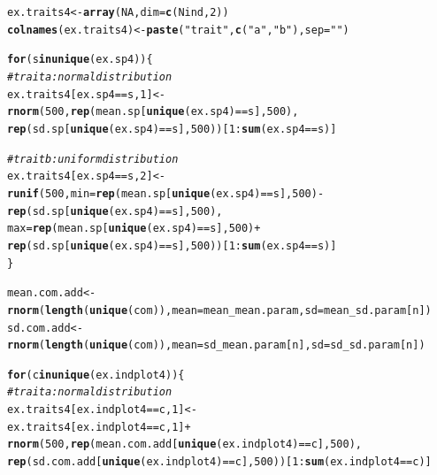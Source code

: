 \documentclass[12pt]{article}\usepackage[]{graphicx}\usepackage[]{color}
\makeatletter
\newcommand{\hlnum}[1]{\textcolor[rgb]{0.686,0.059,0.569}{#1}}%
\newcommand{\hlstr}[1]{\textcolor[rgb]{0.192,0.494,0.8}{#1}}%
\newcommand{\hlcom}[1]{\textcolor[rgb]{0.678,0.584,0.686}{\textit{#1}}}%
\newcommand{\hlopt}[1]{\textcolor[rgb]{0,0,0}{#1}}%
\newcommand{\hlstd}[1]{\textcolor[rgb]{0.345,0.345,0.345}{#1}}%
\newcommand{\hlkwa}[1]{\textcolor[rgb]{0.161,0.373,0.58}{\textbf{#1}}}%
\newcommand{\hlkwb}[1]{\textcolor[rgb]{0.69,0.353,0.396}{#1}}%
\newcommand{\hlkwc}[1]{\textcolor[rgb]{0.333,0.667,0.333}{#1}}%
\newcommand{\hlkwd}[1]{\textcolor[rgb]{0.737,0.353,0.396}{\textbf{#1}}}%
\newenvironment{kframe}{%
 \def\at@end@of@kframe{}%
 \ifinner\ifhmode%
  \def\at@end@of@kframe{\end{minipage}}%
  \begin{minipage}{\columnwidth}%
 \fi\fi%
 \def\FrameCommand##1{\hskip\@totalleftmargin \hskip-\fboxsep
 \colorbox{shadecolor}{##1}\hskip-\fboxsep
     \hskip-\linewidth \hskip-\@totalleftmargin \hskip\columnwidth}%
 \MakeFramed {\advance\hsize-\width
   \@totalleftmargin\z@ \linewidth\hsize
   \@setminipage}}%
 {\par\unskip\endMakeFramed%
 \at@end@of@kframe}
\newenvironment{knitrout}{}{} %
\makeatother
\begin{document}
\begin{knitrout}
\begin{kframe}
\begin{alltt}
\hlstd{ex.traits4} \hlkwb{<-} \hlkwd{array}\hlstd{(}\hlnum{NA}\hlstd{,} \hlkwc{dim} \hlstd{=} \hlkwd{c}\hlstd{(Nind,} \hlnum{2}\hlstd{))}
\hlkwd{colnames}\hlstd{(ex.traits4)} \hlkwb{<-} \hlkwd{paste}\hlstd{(}\hlstr{"trait"}\hlstd{,} \hlkwd{c}\hlstd{(}\hlstr{"a"}\hlstd{,} \hlstr{"b"}\hlstd{),} \hlkwc{sep} \hlstd{=} \hlstr{" "}\hlstd{)}

\hlkwa{for}\hlstd{(s} \hlkwa{in} \hlkwd{unique}\hlstd{(ex.sp4))\{}
 \hlcom{#trait a : normal distribution}
 \hlstd{ex.traits4[ex.sp4} \hlopt{==} \hlstd{s,} \hlnum{1}\hlstd{]} \hlkwb{<-} \hlkwd{rnorm}\hlstd{(}\hlnum{500}\hlstd{,} \hlkwd{rep}\hlstd{(mean.sp[}\hlkwd{unique}\hlstd{(ex.sp4)} \hlopt{==} \hlstd{s],} \hlnum{500}\hlstd{),}
         \hlkwd{rep}\hlstd{(sd.sp[}\hlkwd{unique}\hlstd{(ex.sp4)} \hlopt{==} \hlstd{s],} \hlnum{500}\hlstd{))[}\hlnum{1}\hlopt{:}\hlkwd{sum}\hlstd{(ex.sp4} \hlopt{==} \hlstd{s)]}

 \hlcom{#trait b : uniform distribution}
 \hlstd{ex.traits4[ex.sp4} \hlopt{==} \hlstd{s,} \hlnum{2}\hlstd{]} \hlkwb{<-} \hlkwd{runif}\hlstd{(}\hlnum{500}\hlstd{,} \hlkwc{min} \hlstd{=} \hlkwd{rep}\hlstd{(mean.sp[}\hlkwd{unique}\hlstd{(ex.sp4)} \hlopt{==} \hlstd{s],} \hlnum{500}\hlstd{)} \hlopt{-}
         \hlkwd{rep}\hlstd{(sd.sp[}\hlkwd{unique}\hlstd{(ex.sp4)} \hlopt{==} \hlstd{s],} \hlnum{500}\hlstd{),}
         \hlkwc{max} \hlstd{=} \hlkwd{rep}\hlstd{(mean.sp[}\hlkwd{unique}\hlstd{(ex.sp4)} \hlopt{==} \hlstd{s],} \hlnum{500}\hlstd{)} \hlopt{+}
         \hlkwd{rep}\hlstd{(sd.sp[}\hlkwd{unique}\hlstd{(ex.sp4)} \hlopt{==} \hlstd{s],} \hlnum{500}\hlstd{))[}\hlnum{1}\hlopt{:}\hlkwd{sum}\hlstd{(ex.sp4} \hlopt{==} \hlstd{s)]}
\hlstd{\}}

\hlstd{mean.com.add} \hlkwb{<-} \hlkwd{rnorm}\hlstd{(}\hlkwd{length}\hlstd{(}\hlkwd{unique}\hlstd{(com)),} \hlkwc{mean} \hlstd{= mean_mean.param,} \hlkwc{sd} \hlstd{= mean_sd.param[n])}
\hlstd{sd.com.add} \hlkwb{<-} \hlkwd{rnorm}\hlstd{(}\hlkwd{length}\hlstd{(}\hlkwd{unique}\hlstd{(com)),} \hlkwc{mean} \hlstd{= sd_mean.param[n],} \hlkwc{sd} \hlstd{= sd_sd.param[n])}

\hlkwa{for}\hlstd{(c} \hlkwa{in} \hlkwd{unique}\hlstd{(ex.indplot4))\{}
 \hlcom{#trait a : normal distribution}
 \hlstd{ex.traits4[ex.indplot4} \hlopt{==} \hlstd{c,} \hlnum{1}\hlstd{]} \hlkwb{<-}
 \hlstd{ex.traits4[ex.indplot4} \hlopt{==} \hlstd{c,} \hlnum{1}\hlstd{]} \hlopt{+}
 \hlkwd{rnorm}\hlstd{(}\hlnum{500}\hlstd{,} \hlkwd{rep}\hlstd{(mean.com.add[}\hlkwd{unique}\hlstd{(ex.indplot4)} \hlopt{==} \hlstd{c],} \hlnum{500}\hlstd{),}
 \hlkwd{rep}\hlstd{(sd.com.add [}\hlkwd{unique}\hlstd{(ex.indplot4)} \hlopt{==} \hlstd{c],} \hlnum{500}\hlstd{))[}\hlnum{1}\hlopt{:}\hlkwd{sum}\hlstd{(ex.indplot4} \hlopt{==} \hlstd{c)]}


\end{alltt}
\end{kframe}
\end{knitrout}
\end{document}

